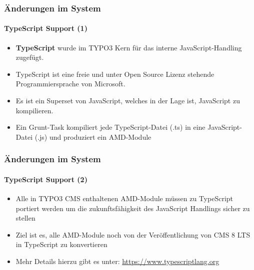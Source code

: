 \begin{frame}[fragile]
	\frametitle{Änderungen im System}
	\framesubtitle{TypeScript Support (1)}

	\begin{itemize}
		\item \textbf{TypeScript} wurde im TYPO3 Kern für das interne JavaScript-Handling zugefügt.
		\item TypeScript ist eine freie und unter Open Source Lizenz stehende Programmiersprache von Microsoft.
		\item Es ist ein Superset von JavaScript, welches in der Lage ist, JavaScript zu kompilieren.
		\item Ein Grunt-Task kompiliert jede TypeScript-Datei (.ts) in eine JavaScript-Datei (.js) und produziert ein AMD-Module
	\end{itemize}

\end{frame}

\begin{frame}[fragile]
	\frametitle{Änderungen im System}
	\framesubtitle{TypeScript Support (2)}

	\begin{itemize}
		\item Alle in TYPO3 CMS enthaltenen AMD-Module müssen zu TypeScript portiert werden um die zukunftsfähigkeit des JavaScript Handlings sicher zu stellen
		\item Ziel ist es, alle AMD-Module noch von der Veröffentlichung von CMS 8 LTS in TypeScript zu konvertieren
		\item Mehr Details hierzu gibt es unter: \url{https://www.typescriptlang.org}
	\end{itemize}

\end{frame}



